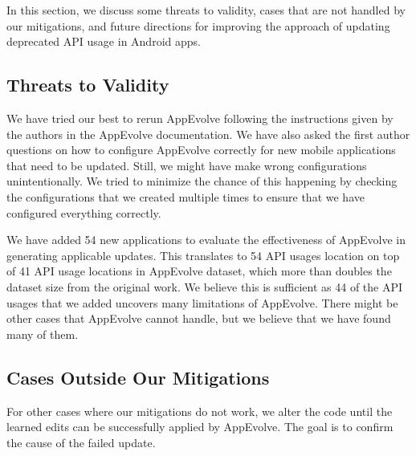 In this section, we discuss some threats to validity, cases that are not handled by our mitigations, and future directions for improving the approach of updating deprecated API usage in Android apps.
\subsection{Threats to Validity}
We have tried our best to rerun AppEvolve following the instructions given by the authors in the AppEvolve documentation. We have also asked the first author questions on how to configure AppEvolve correctly for new mobile applications that need to be updated. Still, we might have make wrong configurations unintentionally. We tried to minimize the chance of this happening by checking the configurations that we created multiple times to ensure that we have configured everything correctly.

We have added 54 new applications to evaluate the effectiveness of AppEvolve in generating applicable updates. This translates to 54 API usages location on top of 41 API usage locations in AppEvolve dataset, which more than doubles the dataset size from the original work. We believe this is sufficient as 44 of the API usages that we added uncovers many limitations of AppEvolve. There might be other cases that AppEvolve cannot handle, but we believe that we have found many of them.


\subsection{Cases Outside Our Mitigations}
For other cases where our mitigations do not work, we alter the code until the learned edits can be successfully applied by AppEvolve. The goal is to confirm the cause of the failed update. 

